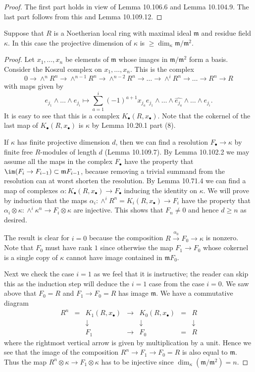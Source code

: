 \begin{proof}
The first part holds in view of Lemma 10.106.6 and Lemma 10.104.9. The last part follows from this and Lemma 10.109.12.
\end{proof}
\begin{lemma}[10.110.3]
Suppose that $R$ is a Noetherian local ring with maximal ideal $\mathfrak m$ and residue field $\kappa$. In this case the projective dimension of $\kappa$ is $\geq\dim_\kappa\mathfrak m/\mathfrak m^2$.
\end{lemma}
\begin{proof}
Let $x_1,\ldots,x_n$ be elements of $\mathfrak m$ whose images in $\mathfrak m/\mathfrak m^2$ form a basis. Consider the Koszul complex on $x_1,\ldots,x_n$. This is the complex
\[
0\to\wedge^nR^n\to\wedge^{n-1}R^n\to\wedge^{n-2}R^n\to\ldots\to\wedge^iR^n\to\ldots\to R^n\to R
\]
with maps given by
\[
e_{j_1}\wedge\ldots\wedge e_{j_i}\longmapsto
\sum_{a=1}^i(-1)^{a+1}x_{j_a}e_{j_1}\wedge\ldots\wedge\widehat{e_{j_a}}\wedge\ldots\wedge e_{j_i}.
\]
It is easy to see that this is a complex $K_\bullet(R,x_\bullet)$. Note that the cokernel of the last map of $K_\bullet(R,x_\bullet)$ is $\kappa$ by Lemma 10.20.1 part (8).

If $\kappa$ has finite projective dimension $d$, then we can find a resolution $F_\bullet\to\kappa$ by finite free $R$-modules of length $d$ (Lemma 10.109.7). By Lemma 10.102.2 we may assume all the maps in the complex $F_\bullet$ have the property that $\im(F_i\to F_{i-1})\subset\mathfrak mF_{i-1}$, because removing a trivial summand from the resolution can at worst shorten the resolution. By Lemma 10.71.4 we can find a map of complexes $\alpha:K_\bullet(R,x_\bullet)\to F_\bullet$ inducing the identity on $\kappa$. We will prove by induction that the maps $\alpha_i:\wedge^iR^n=K_i(R,x_\bullet)\to F_i$ have the property that $\alpha_i\otimes\kappa:\wedge^i\kappa^n\to F_i\otimes\kappa$ are injective. This shows that $F_n\ne0$ and hence $d\geq n$ as desired.

The result is clear for $i=0$ because the composition $R\xrightarrow{\alpha_0}F_0\to\kappa$ is nonzero. Note that $F_0$ must have rank $1$ since otherwise the map $F_1\to F_0$ whose cokernel is a single copy of $\kappa$ cannot have image contained in $\mathfrak mF_0$.

Next we check the case $i=1$ as we feel that it is instructive; the reader can skip this as the induction step will deduce the $i=1$ case from the case $i=0$. We saw above that $F_0=R$ and $F_1\to F_0=R$ has image $\mathfrak m$. We have a commutative diagram
\[
\begin{matrix}
R^n&=&K_1(R,x_\bullet)&\to&K_0(R,x_\bullet)&=&R\\
&&\downarrow&&\downarrow&&\downarrow\\
&&F_1&\to&F_0&=&R
\end{matrix}
\]
where the rightmost vertical arrow is given by multiplication by a unit. Hence we see that the image of the composition $R^n\to F_1\to F_0=R$ is also equal to $\mathfrak m$. Thus the map $R^n\otimes\kappa\to F_1\otimes\kappa$ has to be injective since $\dim_\kappa(\mathfrak m/\mathfrak m^2)=n$.


\end{proof}
